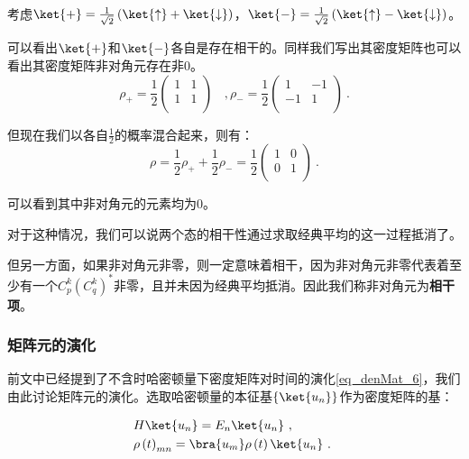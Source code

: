 \begin{example}{}
考虑$\ket{+} = \frac{1}{\sqrt{2}}\left(\ket{\uparrow} + \ket{\downarrow}\right)$，$\ket{-} = \frac{1}{\sqrt{2}}\left(\ket{\uparrow} - \ket{\downarrow}\right)$。

可以看出$\ket{+}$和$\ket{-}$各自是存在相干的。同样我们写出其密度矩阵也可以看出其密度矩阵非对角元存在非$0$。
\begin{equation}
\rho_+ =  \frac{1}{2}\begin{pmatrix}
1&1 \\
1&1 \\
\end{pmatrix}~~~~,
\rho_- =  \frac{1}{2}\begin{pmatrix}
1&-1 \\
-1&1 \\
\end{pmatrix}~.
\end{equation}

但现在我们以各自$\frac{1}{2}$的概率混合起来，则有：
$$\rho = \frac{1}{2}\rho_+ + \frac{1}{2}\rho_- = \frac{1}{2}\begin{pmatrix}
1&0 \\
0&1 \\
\end{pmatrix}~.$$

可以看到其中非对角元的元素均为$0$。
\end{example}

对于这种情况，我们可以说两个态的相干性通过求取经典平均的这一过程抵消了。

但另一方面，如果非对角元非零，则一定意味着相干，因为非对角元非零代表着至少有一个$C_p^k\left(C_q^k\right)^*$非零，且并未因为经典平均抵消。因此我们称非对角元为\textbf{相干项}。

\subsubsection{矩阵元的演化}

前文中已经提到了不含时哈密顿量下密度矩阵对时间的演化\autoref{eq_denMat_6}，我们由此讨论矩阵元的演化。选取哈密顿量的本征基$\left\{\ket{u_n}\right\}$作为密度矩阵的基：

\begin{equation}
\begin{aligned}
&H \ket{u_n} = E_n \ket{u_n}~, \\ 
&\rho\left( t \right)_{mn} = \bra{u_m} \rho\left( t \right) \ket{u_n}~.
\end{aligned}~
\end{equation}

